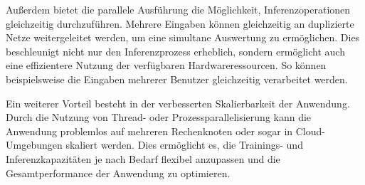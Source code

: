 Außerdem bietet die parallele Ausführung die Möglichkeit, Inferenzoperationen gleichzeitig durchzuführen. Mehrere Eingaben können gleichzeitig an duplizierte Netze weitergeleitet werden, um eine simultane Auswertung zu ermöglichen. Dies beschleunigt nicht nur den Inferenzprozess erheblich, sondern ermöglicht auch eine effizientere Nutzung der verfügbaren Hardwareressourcen. So können beispielsweise die Eingaben mehrerer Benutzer gleichzeitig verarbeitet werden.

Ein weiterer Vorteil besteht in der verbesserten Skalierbarkeit der Anwendung. Durch die Nutzung von Thread- oder Prozessparallelisierung kann die Anwendung problemlos auf mehreren Rechenknoten oder sogar in Cloud-Umgebungen skaliert werden. Dies ermöglicht es, die Trainings- und Inferenzkapazitäten je nach Bedarf flexibel anzupassen und die Gesamtperformance der Anwendung zu optimieren.

